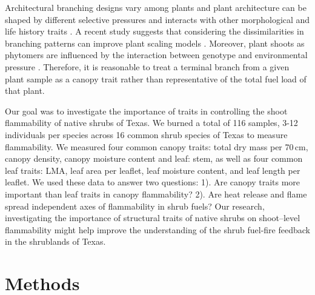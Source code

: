 \documentclass{bmcart}
\begin{document}
Architectural branching designs vary among plants \citep{halle2012tropical} and plant architecture can be shaped by different selective pressures \citep{danell1994browseeffects, schwilk2003flammability} and interacts with other morphological and life history traits \citep{ackerly1998leaf, schwilk2001flammability,archibald2003growing}. A recent study suggests that considering the dissimilarities in branching patterns can improve plant scaling models \citep{bentley2013empirical}. Moreover, plant shoots as phytomers are influenced by the interaction between genotype and environmental pressure \citep{mcsteen2005shoot, wang2008molecular}. Therefore, it is reasonable to treat a terminal branch from a given plant sample as a canopy trait rather than representative of the total fuel load of that plant.

Our goal was to investigate the importance of traits in controlling the shoot flammability of native shrubs of Texas. 
We burned a total of 116 samples, 3-12 individuals per species across 16 common shrub species of Texas to measure flammability. We measured four common canopy traits: total dry mass per 70\,cm, canopy density, canopy moisture content and leaf: stem, as well as four common leaf traits: LMA, leaf area per leaflet, leaf moisture content, and leaf length per leaflet. We used these data to answer two questions: 1). Are canopy traits more important than leaf traits in canopy flammability? 2). Are heat release and flame spread independent axes of flammability in shrub fuels? Our research, investigating the importance of structural traits of native shrubs on shoot--level flammability might help improve the understanding of the shrub fuel-fire feedback in the shrublands of Texas.

\section*{Methods}
\end{document}
